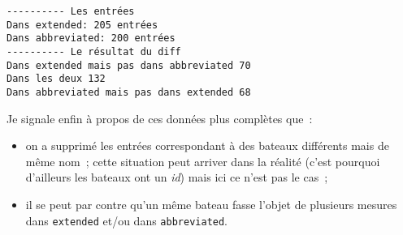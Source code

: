     \begin{Verbatim}[commandchars=\\\{\}]
---------- Les entrées
Dans extended: 205 entrées
Dans abbreviated: 200 entrées
---------- Le résultat du diff
Dans extended mais pas dans abbreviated 70
Dans les deux 132
Dans abbreviated mais pas dans extended 68

    \end{Verbatim}

    Je signale enfin à propos de ces données plus complètes que~:

\begin{itemize}
\tightlist
\item
  on a supprimé les entrées correspondant à des bateaux différents mais
  de même nom~; cette situation peut arriver dans la réalité (c'est
  pourquoi d'ailleurs les bateaux ont un \emph{id}) mais ici ce n'est
  pas le cas~;
\item
  il se peut par contre qu'un même bateau fasse l'objet de plusieurs
  mesures dans \texttt{extended} et/ou dans \texttt{abbreviated}.
\end{itemize}


    
    
    
